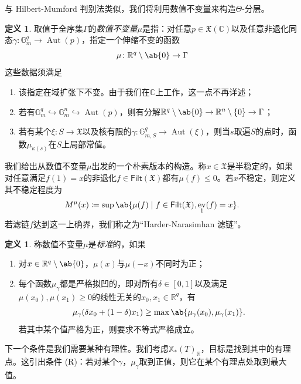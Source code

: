 \documentclass{amsart}
\theoremstyle{definition}
\newtheorem{defn}[thm]{定义}
\theoremstyle{remark}
\theoremstyle{plain}
\theoremstyle{definition}
\theoremstyle{remark}
\newcommand{\G}{\mathbb{G}}
\newcommand{\R}{\mathbb{R}}
\newcommand{\C}{\mathbb{C}}
\newcommand{\mf}[1]{\mathfrak{#1}}
\newcommand{\ms}[1]{\mathsf{#1}}
\newcommand{\1}{\mathbf{1}}
\newcommand{\2}{\mathbf{2}}
\newcommand{\3}{\mathbf{3}}
\DeclareMathOperator{\Aut}{Aut}
\DeclareMathOperator{\ev}{ev}
\begin{document}
与 Hilbert-Mumford 判别法类似，我们将利用数值不变量来构造\(\Theta\)-分层。
\begin{defn}
    取值于全序集\(\Gamma\)的\textit{数值不变量}\(\mu\)是指：对任意\(p \in \mf{X}(\C)\)以及任意非退化同态\(\gamma \colon \G_m^q \to \Aut(p)\)，指定一个伸缩不变的函数
    \[ \mu \colon \R^q \setminus \ab\{0\} \to \Gamma \]
    这些数据须满足
    \begin{enumerate}
        \item 该指定在域扩张下不变。由于我们在\(\C\)上工作，这一点不再详述；
        \item 若有\(\G_m^q \hookrightarrow \G_m^n \hookrightarrow \Aut(p)\)，则有分解\(\R^q \setminus \ab\{0\} \to \R^n \setminus \{0\} \to \Gamma\)；
        \item 若有某个\(\xi \colon S \to \mf{X}\)以及核有限的\(\gamma \colon \G_{m, S}^q \to \Aut(\xi)\)，则当\(s\)取遍\(S\)的点时，函数\(\mu_{\kappa(s)}\)在\(S\)上局部常值。
    \end{enumerate}
\end{defn}

我们给出从数值不变量\(\mu\)出发的一个朴素版本的构造。称\(x \in \mf{X}\)是半稳定的，如果对任意满足\(f(1) = x\)的非退化\(f \in \ms{Filt}(\mf{X})\)都有\(\mu(f) \leq 0\)。若\(x\)不稳定，则定义其不稳定程度为
\[ M^{\mu}(x) \coloneqq \sup \ab\{ \mu(f) \mid f \in \ms{Filt}(\mf{X}), \ev_1(f) = x\}. \]
若滤链\(f\)达到这一上确界，我们称之为“Harder-Narasimhan 滤链”。

\begin{defn}
    称数值不变量\(\mu\)是\textit{标准}的，如果
    \begin{enumerate}
        \item 对\(x \in \R^q \setminus \ab\{0\}\)，\(\mu(x)\)与\(\mu(-x)\)不同时为正；
        \item 每个函数\(\mu_{\gamma}\)都是严格拟凹的，即对所有\(\delta \in [0,1]\)以及满足\(\mu(x_0), \mu(x_1) \geq 0\)的线性无关的\(x_0, x_1 \in \R^q\)，有
            \[\mu_{\gamma}(\delta x_0 + (1-\delta)x_1) \geq \max\ab\{\mu_{\gamma}(x_0), \mu_{\gamma}(x_1)\}.\] 若其中某个值严格为正，则要求不等式严格成立。
    \end{enumerate}
\end{defn}

下一个条件是我们需要某种有理性。我们考虑\(\mathbb{X}_*(T)_{\R}\)，目标是找到其中的有理点。这引出条件 (R)：若对某个\(\gamma\)，\(\mu_{\gamma}\)取到正值，则它在某个有理点处取到最大值。
\end{document}
